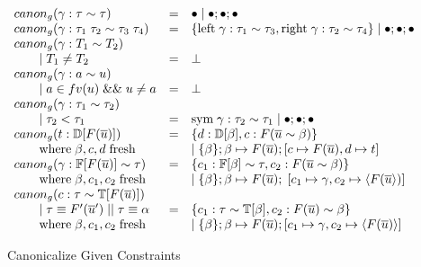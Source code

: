 \begin{figure}
\[
\begin{array}{l c l}
canon_g(\gamma : \tau \sim \tau) &=& \bullet \mid \bullet ; \bullet ; \bullet
\\
canon_g(\gamma : \tau_1 \; \tau_2 \sim \tau_3 \; \tau_4) &=& \{ \text{left} \;
\gamma : \tau_1 \sim \tau_3, \text{right} \; \gamma : \tau_2 \sim \tau_4\} \mid
\bullet ; \bullet ; \bullet
\\
canon_g(\gamma : T_1 \sim T_2)
\\ \qquad \mid T_1 \neq T_2 &=& \bot
\\
canon_g(\gamma : a \sim u)
\\
\qquad \mid a \in fv(u) \; \&\& \; u \neq a &=& \bot
\\
canon_g(\gamma : \tau_1 \sim \tau_2)
\\ \qquad \mid \tau_2 < \tau_1 &=& \text{sym} \; \gamma : \tau_2 \sim \tau_1
\mid \bullet ; \bullet ; \bullet
\\
canon_g(t : \mathbb{D}[F(\overline{u})]) &=& \{ d : \mathbb{D}[\beta], c :
F(\overline{u} \sim \beta)\}
\\ \qquad \text{where} \; \beta, c, d \; \text{fresh} && \mid \{\beta\} ; \beta \mapsto F(\overline{u}) ; [c
\mapsto F(\overline{u}), d \mapsto t]
\\
canon_g(\gamma : \mathbb{F}[F(\overline{u})] \sim \tau) &=& \{ c_1 :
\mathbb{F}[\beta] \sim \tau, c_2 : F(\overline{u} \sim \beta)\}
\\ \qquad \text{where} \; \beta, c_1, c_2 \; \text{fresh} && \mid \{ \beta \} ; \beta \mapsto F(\overline{u}) ; \; [c_1 \mapsto \gamma,
c_2 \mapsto \langle F(\overline{u}  \rangle)]
\\
canon_g(c : \tau \sim \mathbb{T}[F(\overline{u})])
\\ \qquad \mid \tau \equiv F'(\overline{u}') \; || \; \tau \equiv \alpha &=&
\{ c_1 : \tau \sim \mathbb{T}[\beta], c_2 : F(\overline{u}) \sim \beta\}
\\ \qquad \text{where} \; \beta, c_1, c_2 \; \text{fresh} && \mid \{\beta\} ; \beta \mapsto F(\overline{u}) ; [c_1 \mapsto \gamma, c_2
\mapsto \langle F(\overline{u}) \rangle]
\end{array}
\]
\caption{Canonicalize Given Constraints}
\end{figure}

